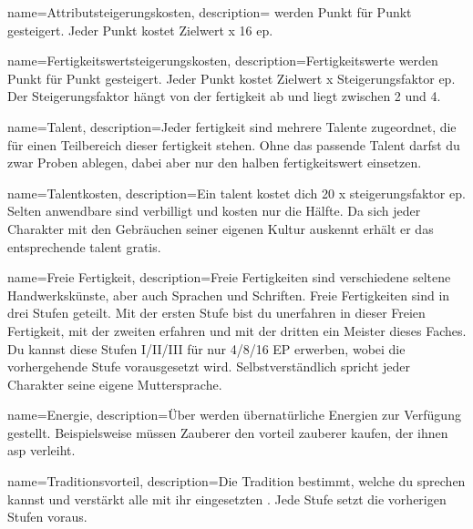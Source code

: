 {
    name={Attributsteigerungskosten},
    description={ werden Punkt für Punkt gesteigert. Jeder Punkt kostet Zielwert x 16 \gls{ep}.}}

{
    name={Fertigkeitswertsteigerungskosten},
    description={Fertigkeits­werte werden Punkt für Punkt gesteigert. Jeder Punkt kostet Zielwert x Steigerungsfaktor \gls{ep}. Der Steigerungsfaktor hängt von der \gls{fertigkeit} ab und liegt zwischen 2 und 4.}}

{
    name={Talent},
    description={Jeder \gls{fertigkeit} sind mehrere Talente zugeordnet, die für einen Teilbereich dieser \gls{fertigkeit} stehen. Ohne das passende Talent darfst du zwar Proben ablegen, dabei aber nur den halben \gls{fertigkeitswert} einsetzen.}}

{
    name={Talentkosten},
    description={Ein \gls{talent} kostet dich 20 x \gls{steigerungsfaktor} \gls{ep}. Selten anwendbare  sind verbilligt und kosten nur die Hälfte. Da sich jeder Charakter mit den Gebräuchen seiner eigenen Kultur auskennt erhält er das entsprechende \gls{talent} gratis.}}

{
    name={Freie Fertigkeit},
    description={Freie Fertigkeiten sind verschiedene seltene Handwerks­künste, aber auch Sprachen und Schriften. Freie Fertigkeiten sind in drei Stufen geteilt. Mit der ersten Stufe bist du unerfahren in dieser Freien Fertigkeit, mit der zweiten erfahren und mit der dritten ein Meister dieses Faches. Du kannst diese Stufen I/II/III für nur 4/8/16 EP erwerben, wobei die vorhergehende Stufe vorausgesetzt wird. Selbstverständlich spricht jeder Charakter seine eigene Muttersprache.}}

{
    name={Energie},
    description={Über  werden übernatürliche Energien zur Verfügung gestellt. Beispielsweise müssen Zauberer den \gls{vorteil} \gls{zauberer} kaufen, der ihnen \gls{asp} verleiht.}}

{
    name={Traditionsvorteil},
    description={Die Tradition bestimmt, welche  du sprechen kannst und verstärkt alle mit ihr eingesetzten . Jede Stufe setzt die vorherigen Stufen voraus.}}

